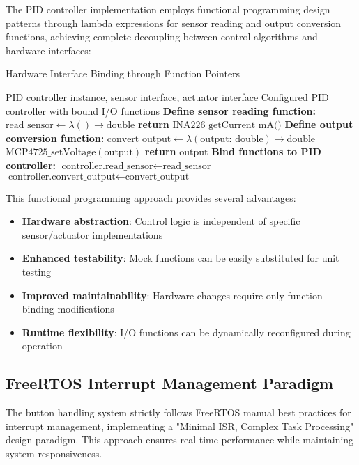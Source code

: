 \documentclass{article}
\begin{document}
The PID controller implementation employs functional programming design patterns through lambda expressions for sensor reading and output conversion functions, achieving complete decoupling between control algorithms and hardware interfaces:

\begin{algorithm}
\caption{Hardware Interface Binding through Function Pointers}
\label{alg:function_binding}
\begin{algorithmic}[1]
\REQUIRE PID controller instance, sensor interface, actuator interface
\ENSURE Configured PID controller with bound I/O functions
\STATE \textbf{Define sensor reading function:}
\STATE $\text{read\_sensor} \leftarrow \lambda() \rightarrow \text{double}$
\STATE \quad \textbf{return} $\text{INA226\_getCurrent\_mA()}$
\STATE
\STATE \textbf{Define output conversion function:}
\STATE $\text{convert\_output} \leftarrow \lambda(\text{output: double}) \rightarrow \text{double}$
\STATE \quad $\text{MCP4725\_setVoltage}(\text{output})$
\STATE \quad \textbf{return} $\text{output}$
\STATE
\STATE \textbf{Bind functions to PID controller:}
\STATE $\text{controller.read\_sensor} \leftarrow \text{read\_sensor}$
\STATE $\text{controller.convert\_output} \leftarrow \text{convert\_output}$
\end{algorithmic}
\end{algorithm}

This functional programming approach provides several advantages:
\begin{itemize}
    \item \textbf{Hardware abstraction}: Control logic is independent of specific sensor/actuator implementations
    \item \textbf{Enhanced testability}: Mock functions can be easily substituted for unit testing
    \item \textbf{Improved maintainability}: Hardware changes require only function binding modifications
    \item \textbf{Runtime flexibility}: I/O functions can be dynamically reconfigured during operation
\end{itemize}

\subsection{FreeRTOS Interrupt Management Paradigm}

The button handling system strictly follows FreeRTOS manual best practices for interrupt management, implementing a "Minimal ISR, Complex Task Processing" design paradigm. This approach ensures real-time performance while maintaining system responsiveness.
\end{document}

